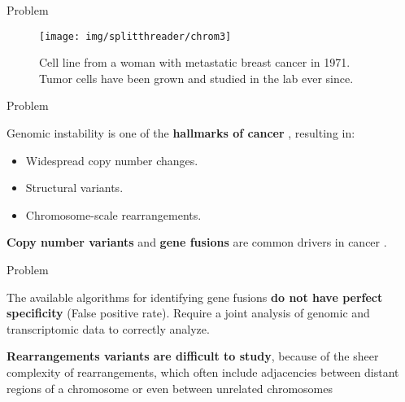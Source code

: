 \documentclass[10pt]{beamer}
\newcommand{\1}{
        	\setbeamertemplate{background}{
        		\texttt{[image: img/1\_BIO]}
        		\tikz[overlay] \fill[fill opacity=0.75,fill=white] (0,0) rectangle (-\paperwidth,\paperheight);
        	}
}
\begin{document}
\begin{frame}{Problem}{}
	\begin{figure}
		\centering
		\texttt{[image: img/splitthreader/chrom3]}
		\caption{Cell line from a woman with metastatic breast cancer in 1971. Tumor cells have been grown and studied in the lab ever since.}
	\end{figure}		
\end{frame}



\begin{frame}{Problem}{}		
	\begin{block}{}		
		Genomic instability is one of the \textbf{hallmarks of cancer} \cite{hanahan2011hallmarks,hastings2009mechanisms},	resulting in:
		\begin{itemize}
			\item Widespread copy number changes.
			\item Structural variants.
			\item Chromosome-scale rearrangements.
		\end{itemize}			
	\end{block}	

	\begin{block}{}		
		\textbf{Copy number variants} and \textbf{gene fusions} are common drivers in cancer \cite{shlien2009copy, mitelman2007impact}.
	\end{block}	
\end{frame}


\begin{frame}{Problem}{}
	\begin{block}{}
		The available algorithms for identifying gene fusions \textbf{do not have perfect specificity} (False positive rate). Require a joint	analysis of genomic and transcriptomic data to correctly analyze.
	\end{block}

	\begin{block}{}
		\textbf{Rearrangements variants are difficult to study}, because of the sheer complexity of rearrangements, which often include adjacencies between distant regions of a chromosome or even between unrelated chromosomes
	\end{block}

\end{frame}
\end{document}
